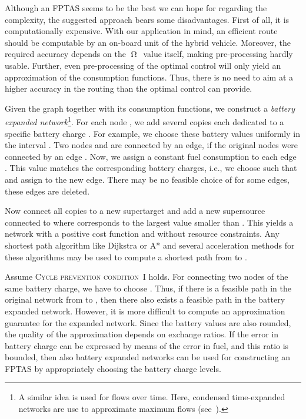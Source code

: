 \documentclass[a4paper]{scrartcl}
\newcommand{\OPT}{\ensuremath{\operatorname{\Omega}}}
\begin{document}
Although an FPTAS seems to be the best we can hope for regarding the complexity, the suggested approach bears some disadvantages. First of all, it is computationally expensive. With our application in mind, an efficient route should be computable by an on-board unit of the hybrid vehicle. Moreover, the required accuracy depends on the \OPT\ value itself, making pre-processing hardly usable.  Further, even pre-processing of the optimal control will only yield an approximation of the consumption functions. Thus, there is no need to aim at a higher accuracy in the routing than the optimal control can provide. 


Given the graph  together with its consumption functions, we construct a \emph{battery expanded network}\footnote{A similar idea is used for flows over time. Here, condensed time-expanded networks are use to approximate maximum flows (see~\cite{FleischerSkutella07}).}.
For each node , we add several copies  each dedicated to a specific battery charge . For example, we choose these battery values uniformly in the interval . Two nodes  and  are connected by an edge, if the original nodes were connected by an edge . Now, we assign a constant fuel consumption to each edge . This value matches the corresponding battery charges, i.e., we choose  such that  and assign  to the new edge. There may be no feasible choice of  for some edges, these edges are deleted. 

Now connect all copies  to a new supertarget  and add a new supersource  connected to  where  corresponds to the largest value smaller than . This yields a network with a positive cost function and without resource constraints. Any shortest path algorithm like Dijkstra or A* and several acceleration methods for these algorithms may be used to compute a shortest path from  to .

Assume \textsc{Cycle prevention condition~I} holds. For connecting two nodes of the same battery charge, we have to choose . Thus, if there is a feasible path in the original network from  to , then there also exists a feasible path in the battery expanded network. However, it is more difficult to compute an approximation guarantee for the expanded network. Since the battery values are also rounded, the quality of the approximation depends on exchange ratios. If the error in battery charge can be expressed by means of the error in fuel, and this ratio is bounded, then also battery expanded networks can be used for constructing an FPTAS by appropriately choosing the battery charge levels.
\end{document}
